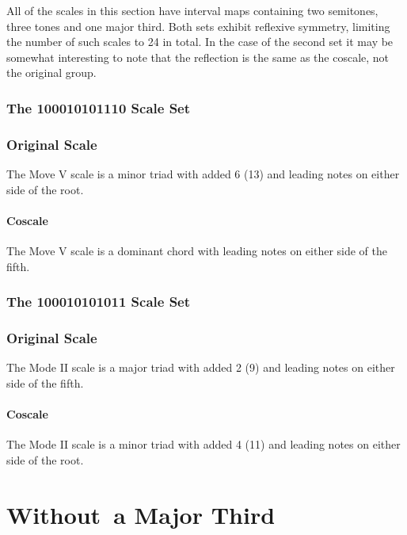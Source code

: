 \documentclass[english]{./gbook}
\begin{document}
\begin{large}
All of the scales in this section have interval maps containing two semitones, three tones and one major third. Both sets exhibit reflexive symmetry, limiting the number of such scales to 24 in total. In the case of the second set it may be somewhat interesting to note that the reflection is the same as the coscale, not the original group.

\subsection{The 100010101110 Scale Set}
\subsection*{Original Scale}
The Move V scale is a minor triad with added 6 (13) and leading notes on either side of the root.
\subsubsection*{Coscale}
The Move V scale is a dominant chord with leading notes on either side of the fifth.

\subsection*{The 100010101011 Scale Set}
\subsection*{Original Scale}
The Mode II scale is a major triad with added 2 (9) and leading notes on either side of the fifth.
\subsubsection*{Coscale}
The Mode II scale is a minor triad with added 4 (11) and leading notes on either side of the root.







\chapter{\mbox{Without a} \mbox{Major} \mbox{Third}}


\end{large}
\end{document}
